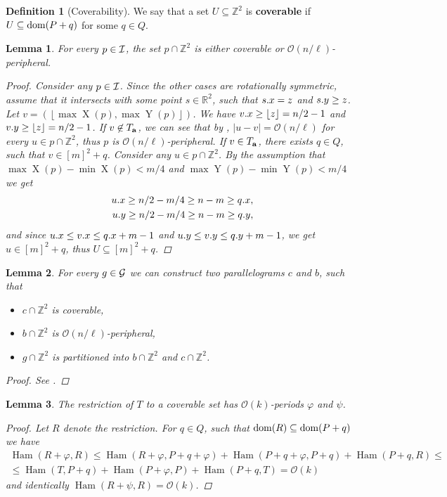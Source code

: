 \documentclass[11pt]{article}
\newcommand{\R}{\mathbb{R}}
\newcommand{\Z}{\mathbb{Z}}
\renewcommand{\O}{\mathcal{O}}
\renewcommand{\phi}{\varphi}
\newcommand{\floor}[1]{\left\lfloor #1 \right\rfloor}
\newcommand{\eq}[1]{\begin{align*} #1 \end{align*}}
\theoremstyle{plain}
\newtheorem{lemma}{Lemma}
\theoremstyle{definition}
\newtheorem{definition}{Definition}
\theoremstyle{remark}
\DeclareMathOperator*{\X}{X}
\DeclareMathOperator*{\Y}{Y}
\DeclareMathOperator*{\Ham}{Ham}
\begin{document}
\begin{definition}[Coverability]
	We say that a set $U \subseteq \Z^2$ is \textbf{coverable} if $U \subseteq \operatorname*{dom}(P + q)$ for some $q \in Q$.
\end{definition}

\begin{lemma}\label{I_division}
	For every $p \in \mathcal{I}$, the set $p \cap \Z^2$ is either coverable or $\O(n / \ell)$-peripheral.
	\begin{proof}
		Consider any $p \in \mathcal{I}$.
		Since the other cases are rotationally symmetric, assume that it intersects with some point $s \in \R^2$, such that $s.x = z$ and $s.y \ge z$.
		Let $v = (\floor{\max \X(p), \max \Y(p)})$.
		We have $\x{v} \ge \floor{z} = n / 2 - 1$ and $\y{v} \ge \floor{z} = n / 2 - 1$.
		If $v \not \in T_\mathbf{a}$, we can see that by ,
		$|u - v| = \O(n / \ell)$ for every $u \in p \cap \Z^2$, thus $p$ is $\O(n / \ell)$-peripheral.
		If $v \in T_\mathbf{a}$, there exists $q \in Q$, such that $v \in [m]^2 + q$.
		Consider any $u \in p \cap \Z^2$.
		By the assumption that $\max \X(p) - \min \X(p) < m / 4$ and $\max \Y(p) - \min \Y(p) < m / 4$ we get
		\eq{
			\x{u} \ge n / 2 - m / 4 \ge n - m \ge \x{q},\\ 
			\y{u} \ge n / 2 - m / 4 \ge n - m \ge \y{q},
		}
		and since $u.x \le v.x \le q.x + m - 1$ and $u.y \le v.y \le q.y + m - 1$, we get $u \in [m]^2 + q$, thus $U \subseteq [m]^2 + q$.
	\end{proof}
\end{lemma}

\begin{lemma}\label{parallelogram_split_lemma}
	For every $g \in \mathcal{G}$ we can construct two parallelograms $c$ and $b$, such that
	\begin{itemize}
		\item $c \cap \Z^2$ is coverable,
		\item $b \cap \Z^2$ is $\O(n / \ell)$-peripheral,
		\item $g \cap \Z^2$ is partitioned into $b \cap \Z^2$ and $c \cap \Z^2$.
	\end{itemize}
	\begin{proof} See . \end{proof}
\end{lemma}

\begin{lemma}\label{coverable is periodic}
	The restriction of $T$ to a coverable set has $\O(k)$-periods $\phi$ and $\psi$.
	\begin{proof}
		Let $R$ denote the restriction. For $q \in Q$, such that $\operatorname*{dom}(R) \subseteq \operatorname*{dom}(P + q)$ we have
		\eq{
			\Ham(R + \phi, R) \le \Ham(R + \phi, P + q + \phi) + \Ham(P + q + \phi, P + q) + \Ham(P + q, R) \le \\
			\le \Ham(T, P + q) + \Ham(P + \phi, P) + \Ham(P + q, T) = \O(k)
		}
		and identically $\Ham(R + \psi, R) = \O(k)$.
	\end{proof}
\end{lemma}
\end{document}
